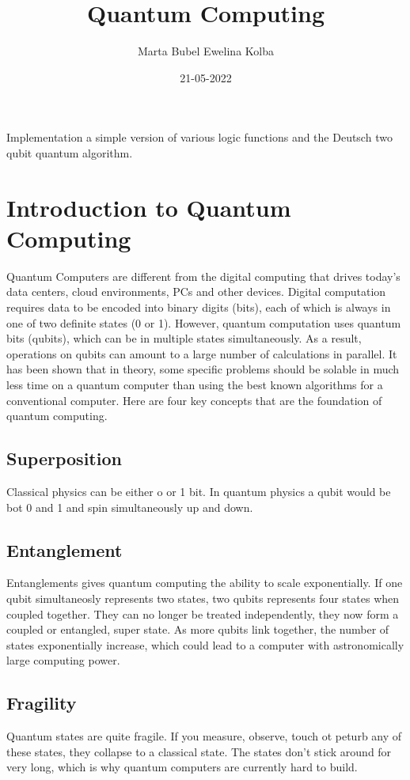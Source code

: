 \documentclass{article}
\title{Quantum Computing}
\author{Marta Bubel Ewelina Kolba}
\date{21-05-2022}
\begin{document}
\maketitle
Implementation a simple version of various logic functions and the Deutsch two qubit quantum algorithm.
\newpage
\renewcommand{\contentsname}{Table of contents}
\tableofcontents
\newpage
\section{Introduction to Quantum Computing}
Quantum Computers are different from the digital computing that drives today's data centers, cloud environments, PCs and other devices. Digital computation requires data to be encoded into binary digits (bits), each of which is always in one of two definite states (0 or 1). However, quantum computation uses quantum bits (qubits), which can be in multiple states simultaneously. As a result, operations on qubits can amount to a large number of calculations in parallel. It has been shown that in theory, some specific problems should be solable in much less time on a quantum computer than using the best known algorithms for a conventional computer. Here are four key concepts that are the foundation of quantum computing.
\subsection{Superposition}
Classical physics can be either o or 1 bit. In quantum physics a qubit would be bot 0 and 1 and spin simultaneously up and down.
\subsection{Entanglement}
Entanglements gives quantum computing the ability to scale exponentially. If one qubit simultaneosly represents two states, two qubits represents four states when coupled together. They can no longer be treated independently, they now form a coupled or entangled, super state. As more qubits link together, the number of states exponentially increase, which could lead to a computer with astronomically large computing power.
\subsection{Fragility}
Quantum states are quite fragile. If you measure, observe, touch ot peturb any of these states, they collapse to a classical state. The states don't stick around for very long, which is why quantum computers are currently hard to build.
\end{document}
